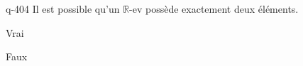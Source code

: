 \begin{truefalse}{q-404}
Il est possible qu'un $\mathbb R$-ev possède exactement deux éléments.
\item Vrai
\item* Faux
\end{truefalse}

